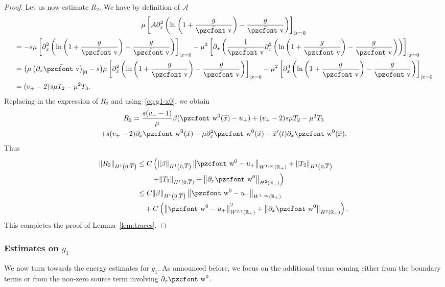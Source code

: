 \documentclass[10pt]{amsart}
\theoremstyle{definition}\newtheorem{defi}[theo]{Definition}\newtheorem{rema}[theo]{Remark}\newtheorem{exam}[theo]{Example}\newtheorem{exem}[theo]{Example}\newtheorem{nota}[theo]{Notation}
\newcommand{\mathpzc}[1]{\text{\pzcfont #1}}
\newcommand{\R}{\mathbb{R}}
\newcommand{\p}{\partial}
\newcommand{\bv}{\bar{\mathpzc{v}}}
\newcommand{\cA}{\mathcal A}
\newcommand{\tw}{\mathpzc{w}}
\newcommand{\tx}{\widetilde{x}}
\begin{document}
\begin{proof}
Let us now estimate $R_2$. We have by definition of $\cA$
\begin{multline*}
 \mu \left[\cA \partial^2_x \left(\ln \left(1+ \frac{g}{\bv}\right) - \frac{g}{\bv} \right) \right]_{|x=0} \\
\begin{aligned}
& = -s \mu \left[\partial^2_x \left(\ln \left(1+ \frac{g}{\bv}\right) - \frac{g}{\bv} \right) \right]_{|x=0} - \mu^2 \left[\partial_x \left(\frac{1}{\bv} \partial^2_x \left(\ln \left(1+ \frac{g}{\bv}\right) - \frac{g}{\bv} \right) \right)\right]_{|x=0}\\
& = \big(\mu\left(\partial_x \bv\right)_{|0}-s\big) \mu \left[\partial^2_x \left(\ln \left(1+ \frac{g}{\bv}\right) - \frac{g}{\bv} \right) \right]_{|x=0} - \mu^2 \left[\partial^3_x \left(\ln \left(1+ \frac{g}{\bv}\right) - \frac{g}{\bv} \right)\right]_{|x=0}\\
& = (v_+-2) s \mu T_2 - \mu^2 T_3.
\end{aligned}
\end{multline*}
Replacing in the expression of $R_2$ and using~\eqref{eq:g1-x0}, we obtain
\begin{multline*}
R_2=\frac{s(v_+-1)}{\mu} \beta (\tw^0(\tx)-u_+) + (v_+-2) s \mu T_2 - \mu^2 T_3\\
+ s (v_+-2) \partial_x \tw^0(\tx) - \mu \partial^2_x \tw^0(\tx) - \tx'(t) \partial_x \tw^0(\tx).
\end{multline*}
Thus
\begin{align*}
\|R_2\|_{H^1\left(0,\overline{T}\right)} &\leq C \left(\|\beta\|_{H^1\left(0, \overline{T}\right)}\left\|\tw^0-u_+\right\|_{W^{1,\infty}(\R_+)} + \|T_2\|_{H^1\left(0, \overline{T}\right)} \right.\\
&\left. \qquad+ \|T_3\|_{H^1(0, \overline{T})} + \left\|\p_x \tw^0\right\|_{H^2(\R_+)}\right)\\
&\leq C \|\beta\|_{H^1\left(0, \overline{T}\right)}\left\|\tw^0-u_+\right\|_{W^{1,\infty}(\R_+)} \\
&\quad+C \left(\left\| \tw^0-u_+\right\|_{W^{2,4}(\R_+)}^2 + \left\|\p_x \tw^0\right\|_{H^2(\R_+)} \right).
\end{align*}
This completes the proof of Lemma~\ref{lem:traces}.
\end{proof}


\subsubsection{Estimates on $g_1$}
We now turn towards the energy estimates for $g_1$. As announced before, we focus on the additional terms coming either from the boundary terms or from the non-zero source term involving $\p_x \tw^0$.
\end{document}
